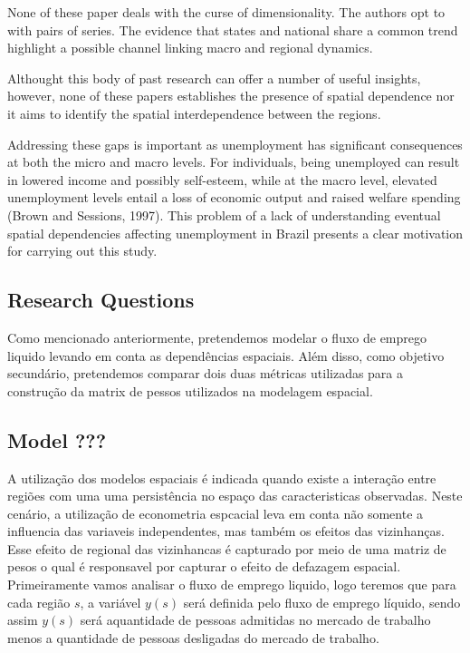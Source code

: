 \documentclass[]{article}
\begin{document}
None of these paper deals with the curse of dimensionality. The authors
opt to with pairs of series. The evidence that states and national share
a common trend highlight a possible channel linking macro and regional
dynamics.

Althought this body of past research can offer a number of useful
insights, however, none of these papers establishes the presence of
spatial dependence nor it aims to identify the spatial interdependence
between the regions.

Addressing these gaps is important as unemployment has significant
consequences at both the micro and macro levels. For individuals, being
unemployed can result in lowered income and possibly self-esteem, while
at the macro level, elevated unemployment levels entail a loss of
economic output and raised welfare spending (Brown and Sessions, 1997).
This problem of a lack of understanding eventual spatial dependencies
affecting unemployment in Brazil presents a clear motivation for
carrying out this study.

\subsection{Research Questions}\label{research-questions}

Como mencionado anteriormente, pretendemos modelar o fluxo de emprego
liquido levando em conta as dependências espaciais. Além disso, como
objetivo secundário, pretendemos comparar dois duas métricas utilizadas
para a construção da matrix de pessos utilizados na modelagem espacial.

\subsection{Model ???}\label{model}

A utilização dos modelos espaciais é indicada quando existe a interação
entre regiões com uma uma persistência no espaço das caracteristicas
observadas. Neste cenário, a utilização de econometria espcacial leva em
conta não somente a influencia das variaveis independentes, mas também
os efeitos das vizinhanças. Esse efeito de regional das vizinhancas é
capturado por meio de uma matriz de pesos o qual é responsavel por
capturar o efeito de defazagem espacial. Primeiramente vamos analisar o
fluxo de emprego liquido, logo teremos que para cada região \(s\), a
variável \(y(s)\) será definida pelo fluxo de emprego líquido, sendo
assim \(y(s)\) será aquantidade de pessoas admitidas no mercado de
trabalho menos a quantidade de pessoas desligadas do mercado de
trabalho.
\end{document}
